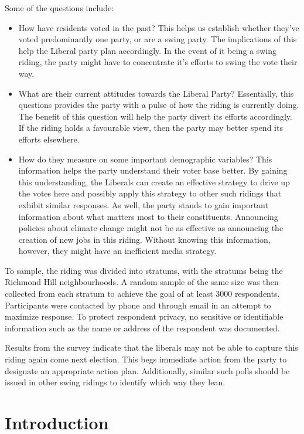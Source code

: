 \documentclass[
]{article}
\begin{document}
Some of the questions include:

\begin{itemize}
\item
  How have residents voted in the past? This helps us establish whether
  they've voted predominantly one party, or are a swing party. The
  implications of this help the Liberal party plan accordingly. In the
  event of it being a swing riding, the party might have to concentrate
  it's efforts to swing the vote their way.
\item
  What are their current attitudes towards the Liberal Party?
  Essentially, this questions provides the party with a pulse of how the
  riding is currently doing. The benefit of this question will help the
  party divert its efforts accordingly. If the riding holds a favourable
  view, then the party may better spend its efforts elsewhere.
\item
  How do they measure on some important demographic variables? This
  information helps the party understand their voter base better. By
  gaining this understanding, the Liberals can create an effective
  strategy to drive up the votes here and possibly apply this strategy
  to other such ridings that exhibit similar responses. As well, the
  party stands to gain important information about what matters most to
  their constituents. Announcing policies about climate change might not
  be as effective as announcing the creation of new jobs in this riding.
  Without knowing this information, however, they might have an
  inefficient media strategy.
\end{itemize}

To sample, the riding was divided into stratums, with the stratums being
the Richmond Hill neighbourhoods. A random sample of the same size was
then collected from each stratum to achieve the goal of at least 3000
respondents. Participants were contacted by phone and through email in
an attempt to maximize response. To protect respondent privacy, no
sensitive or identifiable information such as the name or address of the
respondent was documented.

Results from the survey indicate that the liberals may not be able to
capture this riding again come next election. This begs immediate action
from the party to designate an appropriate action plan. Additionally,
similar such polls should be issued in other swing ridings to identify
which way they lean.

\hypertarget{introduction}{%
\section{Introduction}\label{introduction}}
\end{document}
